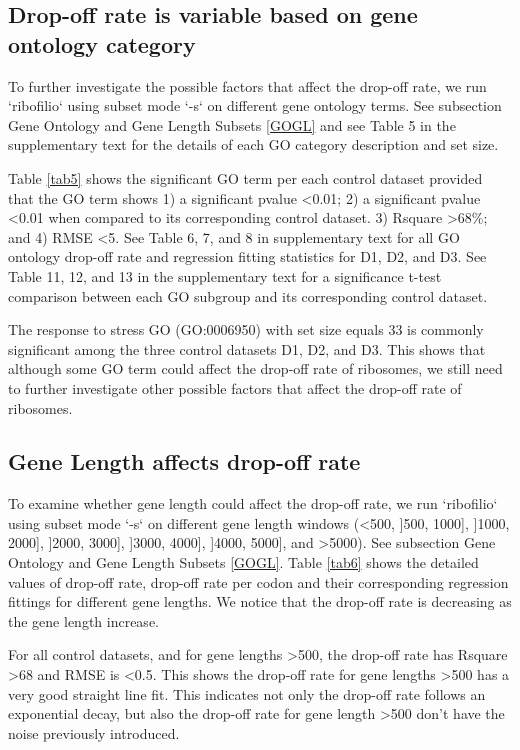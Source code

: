 \documentclass[a4,center,fleqn]{NAR}
\begin{document}
\subsection{Drop-off rate is variable based on gene ontology category}
To further investigate the possible factors that affect the drop-off rate, we run `ribofilio` using subset mode `-s` on different gene ontology terms. See subsection Gene Ontology and Gene Length Subsets \ref{GOGL} and see Table 5 in the supplementary text for the details of each GO category description and set size. 

Table \ref{tab5} shows the significant GO term per each control dataset provided that the GO term shows 1) a significant pvalue \textless 0.01; 2)  a significant  pvalue \textless 0.01 when compared to its corresponding control dataset. 3) Rsquare \textgreater 68\%;  and 4) RMSE \textless 5. 
See Table 6, 7, and 8 in supplementary text for all GO ontology drop-off rate and regression fitting statistics for D1, D2, and D3. See Table 11, 12, and 13 in the supplementary text for a significance t-test comparison between each GO subgroup and its corresponding control dataset. 

The response to stress GO (GO:0006950) with set size equals 33 is commonly significant among the three control datasets D1, D2, and D3.  This shows that although some GO term could affect the drop-off rate of ribosomes, we still need to further investigate other possible factors that affect the drop-off rate of ribosomes.

\subsection{Gene Length affects drop-off rate}

To examine whether gene length could affect the drop-off rate, we run `ribofilio` using subset mode `-s` on different gene length windows (\textless 500, ]500, 1000], ]1000, 2000], ]2000, 3000], ]3000, 4000], ]4000, 5000], and \textgreater 5000). See subsection Gene Ontology and Gene Length Subsets \ref{GOGL}.  Table \ref{tab6} shows the detailed values of drop-off rate, drop-off rate per codon and their corresponding regression fittings for different gene lengths.  We notice that the drop-off rate is decreasing as the gene length increase.

For all control datasets,  and for gene lengths \textgreater 500, the drop-off rate has  Rsquare \textgreater 68 and  RMSE is \textless 0.5. This shows the drop-off rate for gene lengths \textgreater 500 has a very good straight line fit. This indicates not only the drop-off rate follows an exponential decay, but also the drop-off rate for gene length \textgreater 500 don't have the noise previously introduced. 
\end{document}
